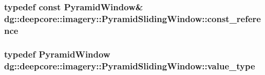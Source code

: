 \subsubsection[{\texorpdfstring{const\+\_\+reference}{const_reference}}]{\setlength{\rightskip}{0pt plus 5cm}typedef const {\bf Pyramid\+Window}\& {\bf dg\+::deepcore\+::imagery\+::\+Pyramid\+Sliding\+Window\+::const\+\_\+reference}}\hypertarget{classdg_1_1deepcore_1_1imagery_1_1_pyramid_sliding_window_a2607e7416973611462d45f5a3772b46e}{}\label{classdg_1_1deepcore_1_1imagery_1_1_pyramid_sliding_window_a2607e7416973611462d45f5a3772b46e}
\subsubsection[{\texorpdfstring{value\+\_\+type}{value_type}}]{\setlength{\rightskip}{0pt plus 5cm}typedef {\bf Pyramid\+Window} {\bf dg\+::deepcore\+::imagery\+::\+Pyramid\+Sliding\+Window\+::value\+\_\+type}}\hypertarget{classdg_1_1deepcore_1_1imagery_1_1_pyramid_sliding_window_ab19431f1af5d94cf35d3c13e62831b0a}{}\label{classdg_1_1deepcore_1_1imagery_1_1_pyramid_sliding_window_ab19431f1af5d94cf35d3c13e62831b0a}
